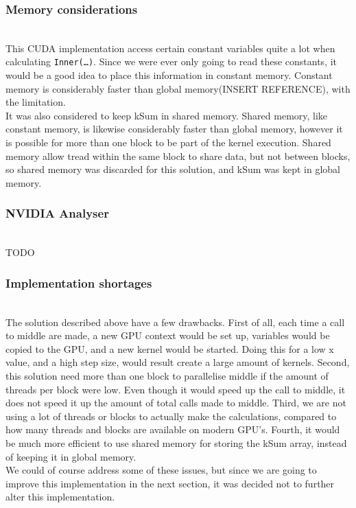 \subsubsection{Memory considerations} \hfill \\
This CUDA implementation access certain constant variables quite a lot when calculating \texttt{Inner(…)}. Since we were ever only going to read these constants, it would be a good idea to place this information in constant memory. Constant memory is considerably faster than global memory(INSERT REFERENCE), with the limitation.\\

It was also considered to keep kSum in shared memory. Shared memory, like constant memory, is likewise considerably faster than global memory, however it is possible for more than one block to be part of the kernel execution. Shared memory allow tread within the same block to share data, but not between blocks, so shared memory was discarded for this solution, and kSum was kept in global memory.

\subsubsection{NVIDIA Analyser} \hfill \\
TODO

\subsubsection{Implementation shortages} \hfill \\
The solution described above have a few drawbacks. First of all, each time a call to middle are made, a new GPU context would be set up, variables would be copied to the GPU, and a new kernel would be started. Doing this for a low x value, and a high step size, would result create a large amount of kernels. Second, this solution need more than one block to parallelise middle if the amount of threads per block were low. Even though it would speed up the call to middle, it does not speed it up the amount of total calls made to middle. Third, we are not using a lot of threads or blocks to actually make the calculations, compared to how many threads and blocks are available on modern GPU’s. Fourth, it would be much more efficient to use shared memory for storing the kSum array, instead of keeping it in global memory.\\

We could of course address some of these issues, but since we are going to improve this implementation in the next section, it was decided not to further alter this implementation. \\
